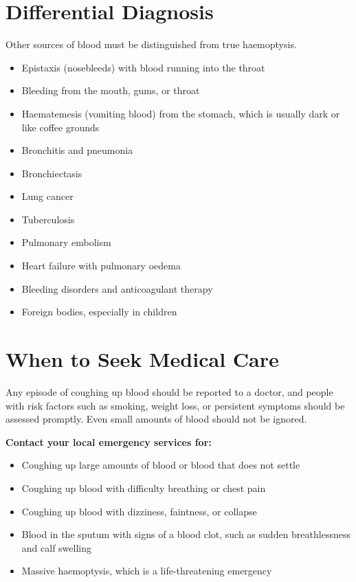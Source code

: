 \section*{Differential Diagnosis}
Other sources of blood must be distinguished from true haemoptysis.

\begin{itemize}
    \item Epistaxis (nosebleeds) with blood running into the throat
    \item Bleeding from the mouth, gums, or throat
    \item Haematemesis (vomiting blood) from the stomach, which is usually dark or like coffee grounds
    \item Bronchitis and pneumonia
    \item Bronchiectasis
    \item Lung cancer
    \item Tuberculosis
    \item Pulmonary embolism
    \item Heart failure with pulmonary oedema
    \item Bleeding disorders and anticoagulant therapy
    \item Foreign bodies, especially in children
\end{itemize}

\section*{When to Seek Medical Care}
Any episode of coughing up blood should be reported to a doctor, and people with risk factors such as smoking, weight loss, or persistent symptoms should be assessed promptly. Even small amounts of blood should not be ignored.

\textbf{Contact your local emergency services for:}
\begin{itemize}
    \item Coughing up large amounts of blood or blood that does not settle
    \item Coughing up blood with difficulty breathing or chest pain
    \item Coughing up blood with dizziness, faintness, or collapse
    \item Blood in the sputum with signs of a blood clot, such as sudden breathlessness and calf swelling
    \item Massive haemoptysis, which is a life-threatening emergency
\end{itemize}

